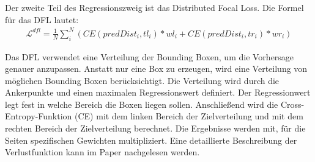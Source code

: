 Der zweite Teil des Regressionszweig ist das Distributed Focal Loss. Die Formel für das DFL lautet:
\begin{align}
	\mathcal{L}^{dfl}=\frac{1}{N}\sum_{i}^{N}(CE(predDist_i, tl_i)*wl_i+CE(predDist_i, tr_i)*wr_i)
\end{align}

Das DFL verwendet eine Verteilung der Bounding Boxen, um die Vorhersage genauer anzupassen. Anstatt nur eine Box zu erzeugen, wird eine Verteilung von möglichen Bounding Boxen berücksichtigt. Die Verteilung wird durch die Ankerpunkte und einen maximalen Regressionswert definiert. Der Regressionwert legt fest in welche Bereich die Boxen liegen sollen. Anschließend wird die Cross-Entropy-Funktion (CE) mit dem linken Bereich der Zielverteilung und mit dem rechten Bereich der Zielverteilung berechnet. Die Ergebnisse werden mit, für die Seiten spezifischen Gewichten multipliziert. Eine detaillierte Beschreibung der Verlustfunktion kann im Paper nachgelesen werden. \cite{dflLoss}

